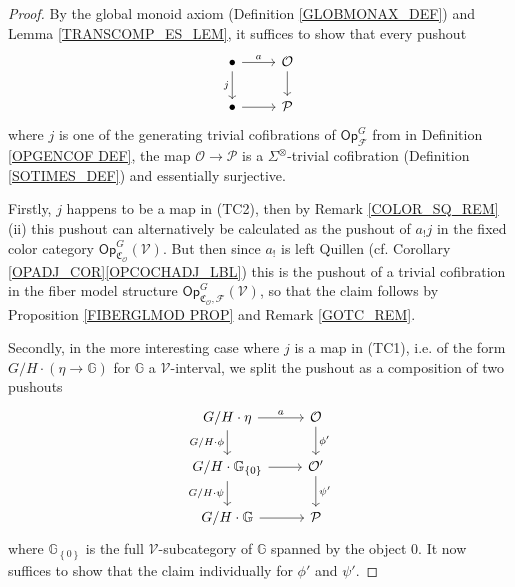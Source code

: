 \documentclass[a4paper,10pt
,draft
]{article}%
\numberwithin{equation}{section}
\numberwithin{figure}{section}
\theoremstyle{definition} %
\newcommand{\set}[1]{\left\{#1\right\}}%
\newcommand{\F}{\ensuremath{\mathcal F}}
\newcommand{\V}{\ensuremath{\mathcal V}}
\renewcommand{\O}{\ensuremath{\mathcal O}}
\renewcommand{\P}{\ensuremath{\mathcal P}}
\newcommand{\1}{\ensuremath{\mathbbm 1}}%
\begin{document}
\begin{proof}
      By the global monoid axiom (Definition \ref{GLOBMONAX_DEF}) and Lemma \ref{TRANSCOMP_ES_LEM}, it suffices to show that every pushout
      \begin{equation}\label{JUSTAPUSH EQ}
            \begin{tikzcd}
                  \bullet \ar{r}{a} \arrow{d}[swap]{j}
                  &
                  \O \arrow{d}
                  \\
                  \bullet \ar{r} 
                  &
                  \P
            \end{tikzcd}
      \end{equation}
      where $j$ is one of the generating trivial cofibrations of $\mathsf{Op}^G_{\F}$ from in Definition \ref{OPGENCOF DEF},
      the map $\O \to \P$ is a $\Sigma^\otimes$-trivial cofibration (Definition \ref{SOTIMES_DEF}) and essentially surjective.
      
      Firstly, $j$ happens to be a map in (TC2), then by Remark \ref{COLOR_SQ_REM}(ii)
      this pushout can alternatively be calculated as the pushout of $a_! j$
      in the fixed color category $\mathsf{Op}^{G}_{\mathfrak C_{\O}}(\V)$.
      But then since $a_!$ is left Quillen (cf. Corollary \ref{OPADJ_COR}\ref{OPCOCHADJ_LBL}) %
      this is the pushout of a trivial cofibration in the fiber model structure
      $\mathsf{Op}^{G}_{\mathfrak C_{\O},\F}(\V)$,
      so that the claim follows by Proposition \ref{FIBERGLMOD PROP} and Remark \ref{GOTC_REM}.
      
      Secondly, in the more interesting case where $j$ is a map in (TC1), 
      i.e. of the form $G/H \cdot (\eta \to \mathbb{G})$ for $\mathbb{G}$ a $\V$-interval,
      we split the pushout as a composition of two pushouts 
      \begin{equation}\label{BROKENPUSH EQ}
            \begin{tikzcd}
                  G/H \cdot \eta \arrow[r, "a"] \arrow[d, "G/H \cdot \phi"']
                  &
                  \O \arrow[d,"\phi'"]
                  \\
                  G/H \cdot \mathbb{G}_{\set{0}} \arrow[r] \arrow[d, "G/H \cdot \psi"']
                  &
                  \O' \arrow[d,"\psi'"]
                  \\
                  G/H \cdot \mathbb{G} \arrow[r]
                  &
                  \P
            \end{tikzcd}
      \end{equation}
      where $\mathbb{G}_{\set{0}}$ is the full $\V$-subcategory of $\mathbb{G}$ spanned by the object $0$.
      It now suffices to show that the claim individually for $\phi'$ and $\psi'$.
      

\end{proof}
\end{document}
